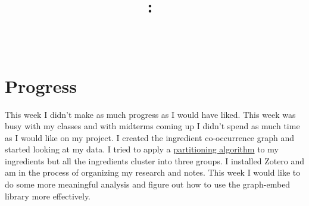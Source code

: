 \documentclass{article}
\title{
    \vspace{2in}
    \textmd{\textbf{\hmwkClass:\ \hmwkTitle}}\\
    \normalsize\vspace{0.1in}\small{\hmwkDueDate}\\
    \vspace{0.1in}\large{\textit{\hmwkClassInstructor}}
    \vspace{3in}
}
\author{\hmwkAuthorName}
\date{}
\begin{document}
\maketitle
\pagebreak

\section{Progress}
This week I didn't make as much progress as I would have liked. This week was busy with my classes and with
midterms coming up I didn't spend as much time as I would like on my project.
I created the ingredient co-occurrence graph and started looking at my data. I tried to apply a 
\href{https://github.com/aujxn/graph-embed/tree/f47f8af147ae88c51bbc013e6c3f17df8eb8133e}{partitioning
algorithm} to my ingredients but all the ingredients cluster into three groups. I installed Zotero and am
in the process of organizing my research and notes. This week I would like to do some more meaningful
analysis and figure out how to use the graph-embed library more effectively.
\end{document}
